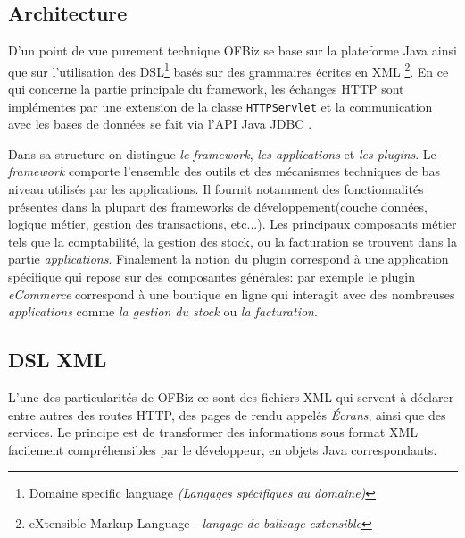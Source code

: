 \subsection{Architecture }
\label{architecture}
D'un point de vue purement technique OFBiz se base sur la plateforme Java ainsi que sur l'utilisation des DSL\footnote{Domaine specific language \emph{(Langages spécifiques au domaine)}} basés sur des grammaires écrites en XML \footnote{ eXtensible Markup Language - \emph{langage de balisage extensible}}. En ce qui concerne la partie principale du framework, les échanges HTTP sont implémentes par une extension de la classe \verb=HTTPServlet= \cite{chan2017servlet} et la communication avec les bases de données se fait via l'API Java JDBC \cite{JDBC}.

Dans sa structure on distingue \emph{le framework}, \emph{les applications} et \emph{les plugins}. Le \emph{framework} comporte l'ensemble des outils et des mécanismes techniques de bas niveau utilisés par les applications. Il fournit notamment des fonctionnalités présentes dans la plupart des frameworks de développement(couche données, logique métier, gestion des transactions, etc...).
Les principaux composants métier tels que la comptabilité, la gestion des stock, ou la facturation se trouvent dans la partie \emph{applications}. 
Finalement la notion du plugin  correspond à une application spécifique qui repose sur des composantes générales: par exemple le plugin \emph{eCommerce} correspond à une boutique en ligne qui interagit avec des nombreuses \emph{applications} comme \emph{la gestion du stock} ou \emph{la facturation}. 

\subsection{DSL XML}
\label{dsl}
L'une des particularités de OFBiz ce sont des fichiers XML qui servent à déclarer entre autres
des routes HTTP, des pages de rendu appelés \emph{Écrans}, ainsi que des services. Le principe est de transformer des informations sous format XML facilement compréhensibles par le développeur, en objets Java correspondants. 


